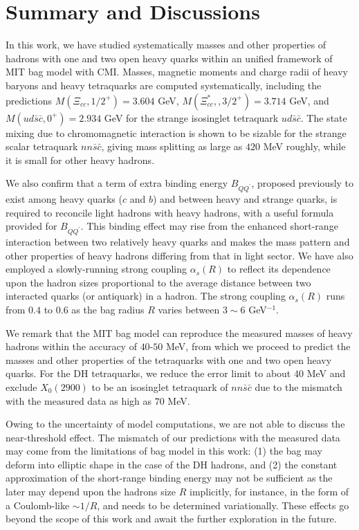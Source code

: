 \documentclass[12pt,prd,onecolumn,floatfix,nofootinbib]{revtex4}
\begin{document}
\section{Summary and Discussions}

\label{Discussions} In this work, we have studied systematically masses and
other properties of hadrons with one and two open heavy quarks within an
unified framework of MIT bag model with CMI. Masses, magnetic moments and 
charge radii of heavy baryons and heavy tetraquarks are computed 
systematically, including the predictions $M(\Xi _{cc},1/2^{+})=3.604$ GeV, $%
M(\Xi _{cc}^{\ast },,3/2^{+})=3.714$ GeV, and $M\left( ud\bar{s}\bar{c}%
,0^{+}\right) =2.934$ GeV for the strange isosinglet tetraquark $ud\bar{s}%
\bar{c}$. The state mixing due to chromomagnetic interaction is shown to be
sizable for the strange scalar tetraquark $nn\bar{s}\bar{c}$, giving mass
splitting as large as $420$ MeV roughly, while it is small for other heavy
hadrons.

We also confirm that a term of extra binding energy $B_{QQ^{\prime }}$,
proposed previously to exist among heavy quarks ($c$ and $b$) and between
heavy and strange quarks\cite{KR:2014gca}, is required to reconcile light
hadrons with heavy hadrons, with a useful formula provided for $B_{QQ^{\prime
}}$. This binding effect may rise from the enhanced short-range interaction
between two relatively heavy quarks and makes the mass pattern and other
properties of heavy hadrons differing from that in light sector. We have
also employed a slowly-running strong coupling $\alpha _{s}(R)$ to reflect
its dependence upon the hadron sizes proportional to the average distance
between two interacted quarks (or antiquark) in a hadron. The strong coupling
$\alpha _{s}(R)$ runs from $0.4$ to $0.6$ as the bag radius $R$ varies
between $3\sim 6$ GeV$^{-1}$.

We remark that the MIT bag model can reproduce the measured masses of heavy
hadrons within the accuracy of $40$-$50$ MeV, from which we proceed to
predict the masses and other properties of the tetraquarks with one and two
open heavy quarks. For the DH tetraquarks, we reduce the error limit to
about $40$ MeV and exclude $X_{0}(2900)$ to be an isosinglet tetraquark of 
$nn\bar{s}\bar{c}$ due to the mismatch with the measured data as high as 
$70$ MeV.

Owing to the uncertainty of model computations, we are not able to discuss
the near-threshold effect. The mismatch of our predictions with the measured
data may come from the limitations of bag model in this work: (1) the bag
may deform into elliptic shape in the case of the DH hadrons, and (2) the
constant approximation of the short-range binding energy may not be
sufficient as the later may depend upon the hadrons size $R$ implicitly, for
instance, in the form of a Coulomb-like $\sim 1/R$, and needs to be
determined variationally. These effects go beyond the scope of this work and
await the further exploration in the future.
\end{document}
